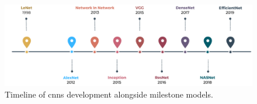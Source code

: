 \begin{figure}[h]
    \centering
    \includegraphics[width=\textwidth]{fig/rel/images/CNN_timeline.pdf}
    \caption{Timeline of \glspl{cnn} development alongside milestone models.}
    \label{fig:cnn_timeline}
\end{figure}